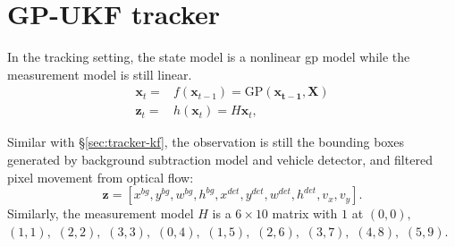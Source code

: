 \section{GP-UKF tracker}

In the tracking setting, the state model is a nonlinear \gls{gp} model while the measurement model is still linear.
\begin{align}
\mathbf{x}_t = & f(\mathbf{x}_{t-1}) = \text{GP}(\mathbf{x_{t-1}}, \mathbf{X}) \\
\mathbf{z}_t = & h(\mathbf{x}_t) = H\mathbf{x}_t,
\end{align}

Similar with \S\ref{sec:tracker-kf}, the observation is still the bounding boxes generated by background subtraction model and vehicle detector, and filtered pixel movement from optical flow: 
$$\mathbf{z}=[x^{bg}, y^{bg}, w^{bg}, h^{bg}, x^{det}, y^{det}, w^{det}, h^{det}, v_x, v_y].$$ 
Similarly, the measurement model $H$ is a $6\times10$ matrix with $1$ at $(0, 0),$ $(1, 1),$ $(2, 2),$ $(3, 3),$ $(0, 4),$ $(1, 5),$ $(2, 6),$ $(3, 7),$ $(4, 8),$ $(5,9)$.

